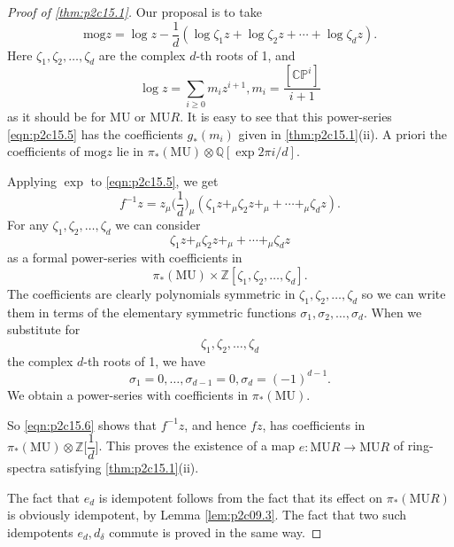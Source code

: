 \documentclass[../main]{subfiles}
\begin{document}
\begin{proof}[Proof of \eqref{thm:p2c15.1}]
Our proposal is to take
\begin{equation}
\label{eqn:p2c15.5}
\tag{15.5}
\mathrm{mog}z=\log z -\dfrac1d(\log\zeta_1z+\log\zeta_2z+\cdots+\log\zeta_dz).
\end{equation}
Here $\zeta_1,\zeta_2,\dots,\zeta_d$ are the complex $d$-th roots of 1, and \[\log z=\sum_{i\geq0}m_iz^{i+1},m_i=\dfrac{[\mathbb{CP}^i]}{i+1}\] as it should be for $\mathrm{MU}$ or $\mathrm{MU}R$. It is easy to see that this power-series \eqref{eqn:p2c15.5} has the coefficients $g_\ast(m_i)$ given in \eqref{thm:p2c15.1}(ii). A priori the coefficients of $\mathrm{mog}z$ lie in $\pi_\ast(\mathrm{MU})\otimes\mathbb{Q}[\exp2\pi i/d]$.

Applying $\exp$ to \eqref{eqn:p2c15.5}, we get 
\begin{equation}
\label{eqn:p2c15.6}
\tag{15.6}
f^{-1}z=z_\mu\Big(\dfrac1d\Big)_\mu(\zeta_1z+_\mu\zeta_2z+_\mu+\cdots+_\mu\zeta_dz).
\end{equation}
For any $\zeta_1,\zeta_2,\dots,\zeta_d$ we can consider \[\zeta_1z+_\mu\zeta_2z+_\mu+\cdots+_\mu\zeta_dz\] as a formal power-series with coefficients in \[\pi_\ast(\mathrm{MU})\times\mathbb{Z}[\zeta_1,\zeta_2,\dots,\zeta_d].\] The coefficients are clearly polynomials symmetric in $\zeta_1, \zeta_2,\dots,\zeta_d$ so we can write them in terms of the elementary symmetric functions $\sigma_1,\sigma_2,\dots,\sigma_d$. When we substitute for \[\zeta_1,\zeta_2,\dots,\zeta_d\] the complex $d$-th roots of 1, we have \[\sigma_1=0,\dots,\sigma_{d-1}=0,\sigma_d=(-1)^{d-1}.\] We obtain a power-series with coefficients in $\pi_\ast(\mathrm{MU})$.

So \eqref{eqn:p2c15.6} shows that $f^{-1}z$, and hence $fz$, has coefficients in $\pi_\ast(\mathrm{MU})\otimes\mathbb{Z}\Big[\dfrac1d\Big]$. This proves the existence of a map $e:\mathrm{MU}R\longrightarrow\mathrm{MU}R$ of ring-spectra satisfying \eqref{thm:p2c15.1}(ii).

The fact that $e_d$ is idempotent follows from the fact that its effect on $\pi_\ast(\mathrm{MU}R)$ is obviously idempotent, by Lemma \ref{lem:p2c09.3}. The fact that two such idempotents $e_d,d_\delta$ commute is proved in the same way. 
\end{proof}
\end{document}
